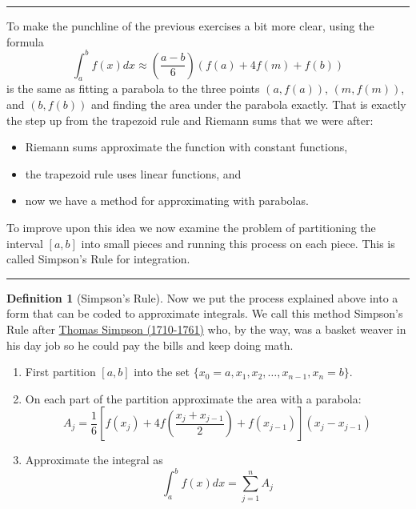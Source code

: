 \documentclass[
]{book}
\providecommand{\tightlist}{%
  \setlength{\itemsep}{0pt}\setlength{\parskip}{0pt}}
\theoremstyle{definition}
\newtheorem{definition}{Definition}[chapter]
\theoremstyle{definition}
\theoremstyle{definition}
\theoremstyle{remark}
\begin{document}
\begin{center}\rule{0.5\linewidth}{0.5pt}\end{center}

To make the punchline of the previous exercises a bit more clear, using the formula
\[\int_a^b f(x) dx \approx \left( \frac{a-b}{6} \right) \left( f(a) + 4 f(m) + f(b)
\right)\] is the same as fitting a parabola to the three points
\((a,f(a))\), \((m,f(m))\), and \((b,f(b))\) and finding the area under the
parabola exactly. That is exactly the step up from the trapezoid rule
and Riemann sums that we were after:

\begin{itemize}
\tightlist
\item
  Riemann sums approximate the function with constant functions,
\item
  the trapezoid rule uses linear functions, and
\item
  now we have a method for approximating with parabolas.
\end{itemize}

To improve upon this idea we now examine the problem of partitioning the
interval \([a,b]\) into small pieces and running this process on each
piece. This is called Simpson's Rule for integration.

\begin{center}\rule{0.5\linewidth}{0.5pt}\end{center}

\begin{definition}[Simpson's Rule]
\protect\hypertarget{def:simpsons-rule}{}{\label{def:simpsons-rule} {} }Now we put the process explained above into a form that can be coded to
approximate integrals. We call this method Simpson's Rule after \href{https://en.wikipedia.org/wiki/Thomas_Simpson}{Thomas Simpson (1710-1761)} who, by the way, was a basket weaver in his day job so he could pay the bills and keep doing math.

\begin{enumerate}
\def\labelenumi{\alph{enumi}.}
\item
  First partition \([a,b]\) into the set
  \(\{x_0=a, x_1, x_2, \ldots, x_{n-1},  x_n=b\}\).
\item
  On each part of the partition approximate the area with a parabola:
  \[A_j = \frac{1}{6} \left[ f(x_j) + 4 f\left( \frac{x_j+x_{j-1}}{2} \right) +
                  f(x_{j-1}) \right]\left( x_j - x_{j-1} \right)\]
\item
  Approximate the integral as \[\int_a^b f(x) dx = \sum_{j=1}^n A_j\]
\end{enumerate}
\end{definition}
\end{document}
